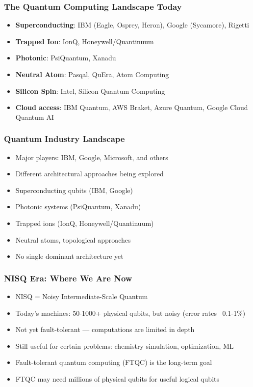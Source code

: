 \begin{frame}[fragile]\frametitle{The Quantum Computing Landscape Today}
\begin{itemize}
\item \textbf{Superconducting}: IBM (Eagle, Osprey, Heron), Google (Sycamore), Rigetti
\item \textbf{Trapped Ion}: IonQ, Honeywell/Quantinuum
\item \textbf{Photonic}: PsiQuantum, Xanadu
\item \textbf{Neutral Atom}: Pasqal, QuEra, Atom Computing
\item \textbf{Silicon Spin}: Intel, Silicon Quantum Computing
\item \textbf{Cloud access}: IBM Quantum, AWS Braket, Azure Quantum, Google Cloud Quantum AI
\end{itemize}
\end{frame}

\begin{frame}[fragile]\frametitle{Quantum Industry Landscape}
\begin{itemize}
\item Major players: IBM, Google, Microsoft, and others
\item Different architectural approaches being explored
\item Superconducting qubits (IBM, Google)
\item Photonic systems (PsiQuantum, Xanadu)
\item Trapped ions (IonQ, Honeywell/Quantinuum)
\item Neutral atoms, topological approaches
\item No single dominant architecture yet
\end{itemize}
\end{frame}

\begin{frame}[fragile]\frametitle{NISQ Era: Where We Are Now}
\begin{itemize}
\item NISQ = Noisy Intermediate-Scale Quantum
\item Today's machines: 50-1000+ physical qubits, but noisy (error rates ~0.1-1\%)
\item Not yet fault-tolerant --- computations are limited in depth
\item Still useful for certain problems: chemistry simulation, optimization, ML
\item Fault-tolerant quantum computing (FTQC) is the long-term goal
\item FTQC may need millions of physical qubits for useful logical qubits
\end{itemize}
\end{frame}

